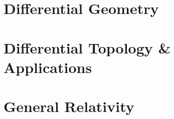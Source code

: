 \documentclass[a4paper,11pt]{book}
\begin{document}
\frontmatter


\newpage

\newpage

\newpage
\tableofcontents
\mainmatter




\part{Differential Geometry}












\part{Differential Topology \& Applications}













\part{General Relativity}




\end{document}
